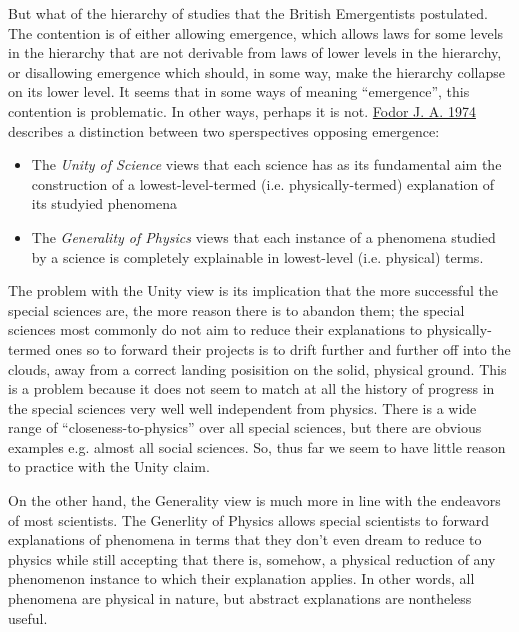 \documentclass{article}
\newcommand{\ti}[1]{\textit{#1}}
\renewcommand{\cite}[1]{\hyperlink{#1}{#1}}
\begin{document}

But what of the hierarchy of studies that the British Emergentists postulated. The contention is of either allowing emergence, which allows laws for some levels in the hierarchy that are not derivable from laws of lower levels in the hierarchy, or disallowing emergence which should, in some way, make the hierarchy collapse on its lower level. It seems that in some ways of meaning ``emergence'', this contention is problematic. In other ways, perhaps it is not. \cite{Fodor J. A. 1974} describes a distinction between two sperspectives opposing emergence:

\begin{itemize}
    \item The \ti{Unity of Science} views that each science has as its fundamental aim the construction of a lowest-level-termed (i.e. physically-termed) explanation of its studyied phenomena
    \item The \ti{Generality of Physics} views that each instance of a phenomena studied by a science is completely explainable in lowest-level (i.e. physical) terms.
\end{itemize}

The problem with the Unity view is its implication that the more successful the special sciences are, the more reason there is to abandon them; the special sciences most commonly do not aim to reduce their explanations to physically-termed ones so to forward their projects is to drift further and further off into the clouds, away from a correct landing posisition on the solid, physical ground. This is a problem because it does not seem to match at all the history of progress in the special sciences very well well independent from physics. There is a wide range of ``closeness-to-physics'' over all special sciences, but there are obvious examples e.g. almost all social sciences. So, thus far we seem to have little reason to practice with the Unity claim.

On the other hand, the Generality view is much more in line with the endeavors of most scientists. The Generlity of Physics allows special scientists to forward explanations of phenomena in terms that they don't even dream to reduce to physics while still accepting that there is, somehow, a physical reduction of any phenomenon instance to which their explanation applies. In other words, all phenomena are physical in nature, but abstract explanations are nontheless useful.
\end{document}
